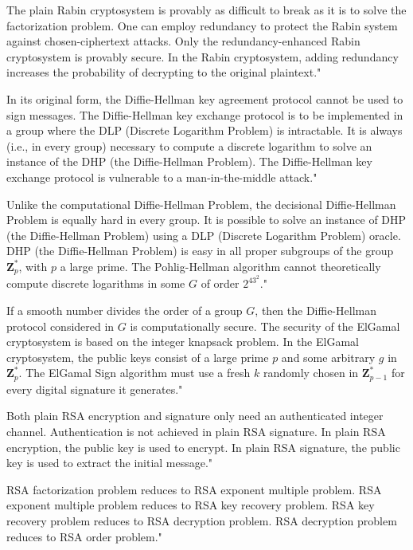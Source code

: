 {The plain Rabin cryptosystem is provably as difficult to break as it is to solve the factorization problem.}
{One can employ redundancy to protect the Rabin system against chosen-ciphertext attacks.}
{Only the redundancy-enhanced Rabin cryptosystem is provably secure.}
{In the Rabin cryptosystem, adding redundancy increases the probability of decrypting to the original plaintext."}

{In its original form, the Diffie-Hellman key agreement protocol cannot be used to sign messages.}
{The Diffie-Hellman key exchange protocol is to be implemented in a group where the DLP (Discrete Logarithm Problem) is intractable.}
{It is always (i.e., in every group) necessary to compute a discrete logarithm to solve an instance of the DHP (the Diffie-Hellman Problem).}
{The Diffie-Hellman key exchange protocol is vulnerable to a man-in-the-middle attack."}

{Unlike the computational Diffie-Hellman Problem, the decisional Diffie-Hellman Problem is equally hard in every group.}
{It is possible to solve an instance of DHP (the Diffie-Hellman Problem) using a DLP (Discrete Logarithm Problem) oracle.}
{DHP (the Diffie-Hellman Problem) is easy in all proper subgroups of the group $\mathbf{Z}_p^{*}$, with $p$ a large prime.}
{The Pohlig-Hellman algorithm cannot theoretically compute discrete logarithms in some $G$ of order $2^43^2$."}

{If a smooth number divides the order of a group $G$, then the Diffie-Hellman protocol considered in $G$ is computationally secure.}
{The security of the ElGamal cryptosystem is based on the integer knapsack problem.}
{In the ElGamal cryptosystem, the public keys consist of a large prime $p$ and some arbitrary $g$ in $\mathbf{Z}^{*}_p$.}
{The ElGamal Sign algorithm must use a fresh $k$ randomly chosen in $\mathbf{Z}^{*}_{p-1}$ for every digital signature it generates."}

{Both plain RSA encryption and signature only need an authenticated integer channel.}
{Authentication is not achieved in plain RSA signature.}
{In plain RSA encryption, the public key is used to encrypt.}
{In plain RSA signature, the public key is used to extract the initial message."}

{RSA factorization problem reduces to RSA exponent multiple problem.}
{RSA exponent multiple problem reduces to RSA key recovery problem.}
{RSA key recovery problem reduces to RSA decryption problem.}
{RSA decryption problem reduces to RSA order problem."}

